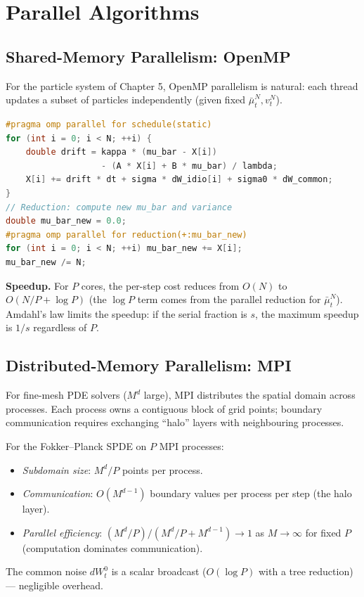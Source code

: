 \section{Parallel Algorithms}
\label{sec:sc-parallel}

\subsection{Shared-Memory Parallelism: OpenMP}

For the particle system of Chapter 5, OpenMP parallelism is natural: each thread
updates a subset of particles independently (given fixed $\bar\mu_t^N, v_t^N$).

\begin{lstlisting}[language=C++, caption={OpenMP parallelisation of particle update.}]
#pragma omp parallel for schedule(static)
for (int i = 0; i < N; ++i) {
    double drift = kappa * (mu_bar - X[i])
                   - (A * X[i] + B * mu_bar) / lambda;
    X[i] += drift * dt + sigma * dW_idio[i] + sigma0 * dW_common;
}
// Reduction: compute new mu_bar and variance
double mu_bar_new = 0.0;
#pragma omp parallel for reduction(+:mu_bar_new)
for (int i = 0; i < N; ++i) mu_bar_new += X[i];
mu_bar_new /= N;
\end{lstlisting}

\textbf{Speedup.} For $P$ cores, the per-step cost reduces from $O(N)$ to
$O(N/P + \log P)$ (the $\log P$ term comes from the parallel reduction for
$\bar\mu_t^N$). Amdahl's law limits the speedup: if the serial fraction is $s$,
the maximum speedup is $1/s$ regardless of $P$.

\subsection{Distributed-Memory Parallelism: MPI}

For fine-mesh PDE solvers ($M^d$ large), MPI distributes the spatial domain across
processes. Each process owns a contiguous block of grid points; boundary communication
requires exchanging ``halo'' layers with neighbouring processes.

For the Fokker--Planck SPDE on $P$ MPI processes:
\begin{itemize}
    \item \textit{Subdomain size}: $M^d / P$ points per process.
    \item \textit{Communication}: $O(M^{d-1})$ boundary values per process per
    step (the halo layer).
    \item \textit{Parallel efficiency}: $(M^d/P) / (M^d/P + M^{d-1}) \to 1$
    as $M \to \infty$ for fixed $P$ (computation dominates communication).
\end{itemize}
The common noise $dW_t^0$ is a scalar broadcast ($O(\log P)$ with a tree
reduction) — negligible overhead.

